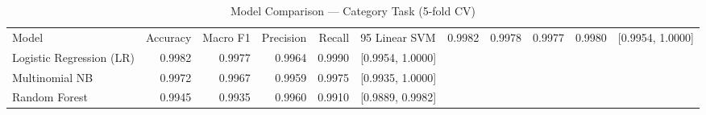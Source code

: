 \begin{table}
\caption{Model Comparison — Category Task (5-fold CV)}
\label{tab:results_category}
\begin{tabular}{lrrrrl}
\toprule
Model & Accuracy & Macro F1 & Precision & Recall & 95%
\midrule
Linear SVM & 0.9982 & 0.9978 & 0.9977 & 0.9980 & [0.9954, 1.0000] \\
Logistic Regression (LR) & 0.9982 & 0.9977 & 0.9964 & 0.9990 & [0.9954, 1.0000] \\
Multinomial NB & 0.9972 & 0.9967 & 0.9959 & 0.9975 & [0.9935, 1.0000] \\
Random Forest & 0.9945 & 0.9935 & 0.9960 & 0.9910 & [0.9889, 0.9982] \\
\bottomrule
\end{tabular}
\end{table}
